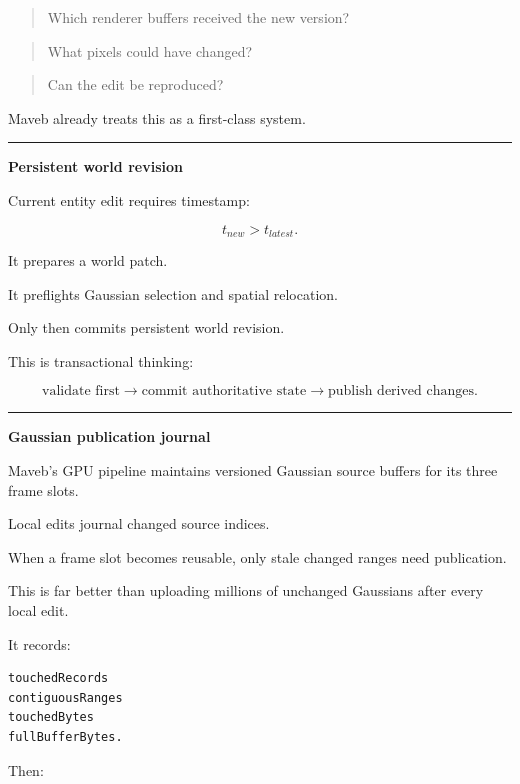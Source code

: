 \begin{quote}
Which renderer buffers received the new version?
\end{quote}

\begin{quote}
What pixels could have changed?
\end{quote}

\begin{quote}
Can the edit be reproduced?
\end{quote}

Maveb already treats this as a first-class system.

\begin{center}\rule{0.5\linewidth}{0.5pt}\end{center}

\textbf{Persistent world revision}

Current entity edit requires timestamp:

\[
t_{new}
>
t_{latest}.
\]

It prepares a world patch.

It preflights Gaussian selection and spatial relocation.

Only then commits persistent world revision.

This is transactional thinking:

\[
\boxed{
\text{validate first}
\rightarrow
\text{commit authoritative state}
\rightarrow
\text{publish derived changes}.
}
\]

\begin{center}\rule{0.5\linewidth}{0.5pt}\end{center}

\textbf{Gaussian publication journal}

Maveb's GPU pipeline maintains versioned Gaussian source buffers for its three frame slots.

Local edits journal changed source indices.

When a frame slot becomes reusable, only stale changed ranges need publication.

This is far better than uploading millions of unchanged Gaussians after every local edit.

It records:

\protect{}\label{z2q1ht}%
\begin{verbatim}
touchedRecords
contiguousRanges
touchedBytes
fullBufferBytes.
\end{verbatim}

Then:

